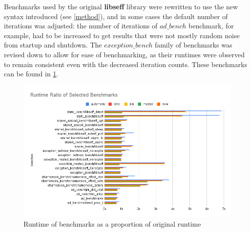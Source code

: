\documentclass[logo,bsc,singlespacing,parskip,online]{infthesis}
\begin{document}

Benchmarks used by the original \textbf{libseff} library were rewritten to use the new syntax introduced (see \cref{method}), and in some cases the default number of iterations was adjusted: the number of iterations of $ad\_bench$ benchmark, for example, had to be increased to get results that were not mostly random noise from startup and shutdown. The $exception\_bench$ family of benchmarks was revised down to allow for ease of benchmarking, as their runtimes were observed to remain consistent even with the decreased iteration counts. These benchmarks can be found in \cref{fig:many}.

\begin{figure}[ht]
    \centering
    \includegraphics[width=1\linewidth]{all_new.png}
    \caption{Runtime of benchmarks as a proportion of original runtime}
    \label{fig:many}
\end{figure}
\end{document}
